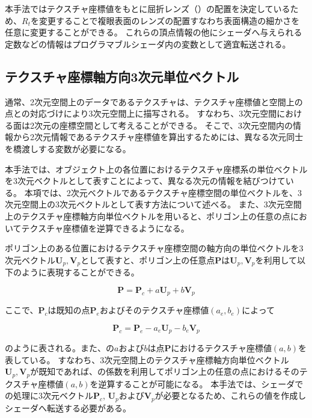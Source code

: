 本手法ではテクスチャ座標値をもとに屈折レンズ（）の配置を決定しているため、$R_t$を変更することで複眼表面のレンズの配置すなわち表面構造の細かさを任意に変更することができる。
これらの頂点情報の他にシェーダへ与えられる定数などの情報はプログラマブルシェーダ内の変数として適宜転送される。

\subsection{テクスチャ座標軸方向3次元単位ベクトル}
\label{SSUnitvec}

通常、2次元空間上のデータであるテクスチャは、テクスチャ座標値と空間上の点との対応づけにより3次元空間上に描写される。
すなわち、3次元空間における面は2次元の座標空間として考えることができる\figref{}。
そこで、3次元空間内の情報から2次元情報であるテクスチャ座標値を算出するためには、異なる次元同士を橋渡しする変数が必要になる。

本手法では、オブジェクト上の各位置におけるテクスチャ座標系の単位ベクトルを3次元ベクトルとして表すことによって、異なる次元の情報を結びつけている。
本項では、2次元ベクトルであるテクスチャ座標空間の単位ベクトルを、3次元空間上の3次元ベクトルとして表す方法について述べる。
また、3次元空間上のテクスチャ座標軸方向単位ベクトルを用いると、ポリゴン上の任意の点においてテクスチャ座標値を逆算できるようになる。

ポリゴン上のある位置におけるテクスチャ座標空間の軸方向の単位ベクトルを3次元ベクトル$\bm{U}_p, \bm{V}_p$として表すと、ポリゴン上の任意点$\bm{P}$は$\bm{U}_p, \bm{V}_p$を利用して以下のように表現することができる。

\begin{equation}
\bm{P} = \bm{P}_c + a\bm{U}_p + b\bm{V}_p
\label{EPuv}
\end{equation}

\noindent
ここで、$\bm{P}_c$は既知の点$\bm{P}_e$およびそのテクスチャ座標値$(a_e, b_e)$によって

\begin{equation}
\bm{P}_c = \bm{P}_e - a_e\bm{U}_p - b_e\bm{V}_p
\label{EPc}
\end{equation}

\noindent
{}のように表される。また、の$a$および$b$は点$\bm{P}$におけるテクスチャ座標値$(a, b)$を表している。
すなわち、3次元空間上のテクスチャ座標軸方向単位ベクトル$\bm{U}_p, \bm{V}_p$が既知であれば、の係数を利用してポリゴン上の任意の点におけるそのテクスチャ座標値$(a, b)$を逆算することが可能になる。
本手法では、シェーダでの処理に3次元ベクトル$\bm{P}_c$, $\bm{U}_p$および$\bm{V}_p$が必要となるため、これらの値を作成しシェーダへ転送する必要がある。

